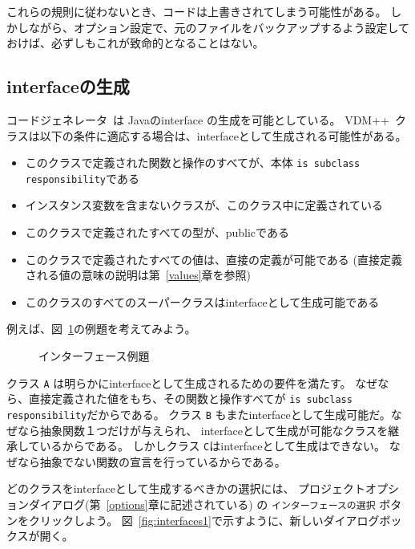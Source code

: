 \documentclass[\pformat,11pt]{jarticle}
\newcommand{\Tcg}{コードジェネレータ}
\newcommand{\VDM}{VDM++}
\begin{document}
これらの規則に従わないとき、コードは上書きされてしまう可能性がある。
しかしながら、オプション設定で、元のファイルをバックアップするよう設定しておけば、必ずしもこれが致命的となることはない。


\subsection{interfaceの生成}\label{sec:interfaces}

\Tcg\ は Javaのinterface \cite{Gosling&00}の生成を可能としている。
 \VDM\ クラスは以下の条件に適応する場合は、interfaceとして生成される可能性がある。

\begin{itemize}
\item このクラスで定義された関数と操作のすべてが、本体 \texttt{is subclass responsibility}である
\item インスタンス変数を含まないクラスが、このクラス中に定義されている
\item このクラスで定義されたすべての型が、publicである
\item このクラスで定義されたすべての値は、直接の定義が可能である (直接定義される値の意味の説明は第~\ref{values}章を参照)
\item このクラスのすべてのスーパークラスはinterfaceとして生成可能である
\end{itemize}

例えば、図~\ref{fig:interfacesex}の例題を考えてみよう。
\begin{figure}
\begin{screen}

\end{screen}
\caption{インターフェース例題}\label{fig:interfacesex}
\end{figure}
クラス \texttt{A} は明らかにinterfaceとして生成されるための要件を満たす。
なぜなら、直接定義された値をもち、その関数と操作すべてが \texttt{is subclass responsibility}だからである。
クラス \texttt{B} もまたinterfaceとして生成可能だ。なぜなら抽象関数１つだけが与えられ、
interfaceとして生成が可能なクラスを継承しているからである。
しかしクラス \texttt{C}はinterfaceとして生成はできない。
なぜなら抽象でない関数の宣言を行っているからである。

どのクラスをinterfaceとして生成するべきかの選択には、
プロジェクトオプションダイアログ(第~\ref{options}章に記述されている) 
の \texttt{インターフェースの選択} ボタンをクリックしよう。 
図~\ref{fig:interfaces1}で示すように、新しいダイアログボックスが開く。 
\end{document}
